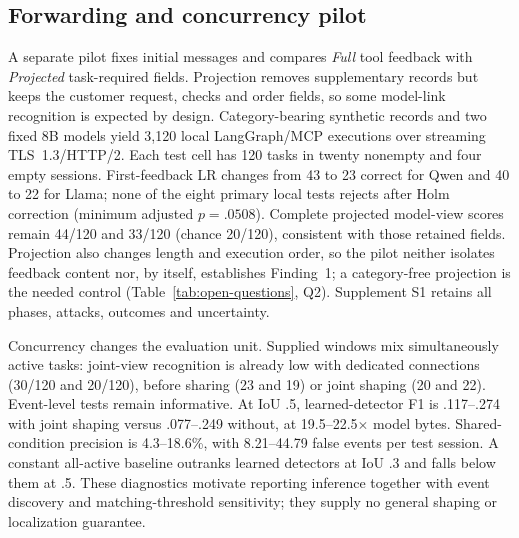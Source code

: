 \subsection{Forwarding and concurrency pilot}\label{sec:live-study}
A separate pilot fixes initial messages and compares \emph{Full} tool feedback with \emph{Projected} task-required fields. Projection removes supplementary records but keeps the customer request, checks and order fields, so some model-link recognition is expected by design. Category-bearing synthetic records and two fixed 8B models yield 3,120 local LangGraph/MCP executions over streaming TLS~1.3/HTTP/2. Each test cell has 120 tasks in twenty nonempty and four empty sessions. First-feedback LR changes from 43 to 23 correct for Qwen and 40 to 22 for Llama; none of the eight primary local tests rejects after Holm correction (minimum adjusted $p=.0508$). Complete projected model-view scores remain 44/120 and 33/120 (chance 20/120), consistent with those retained fields. Projection also changes length and execution order, so the pilot neither isolates feedback content nor, by itself, establishes Finding~1; a category-free projection is the needed control (Table~\ref{tab:open-questions}, Q2). Supplement S1 retains all phases, attacks, outcomes and uncertainty.

Concurrency changes the evaluation unit. Supplied windows mix simultaneously active tasks: joint-view recognition is already low with dedicated connections (30/120 and 20/120), before sharing (23 and 19) or joint shaping (20 and 22). Event-level tests remain informative. At IoU .5, learned-detector F1 is .117--.274 with joint shaping versus .077--.249 without, at 19.5--22.5$\times$ model bytes. Shared-condition precision is 4.3--18.6\%, with 8.21--44.79 false events per test session. A constant all-active baseline outranks learned detectors at IoU .3 and falls below them at .5. These diagnostics motivate reporting inference together with event discovery and matching-threshold sensitivity; they supply no general shaping or localization guarantee.
